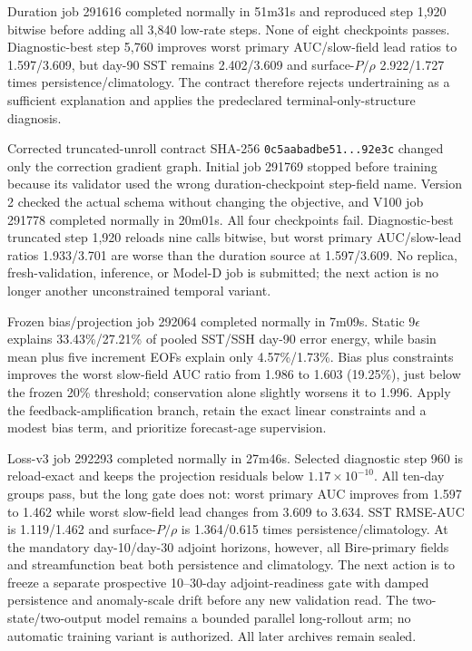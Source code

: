 \documentclass[11pt]{article}
\begin{document}
Duration job 291616 completed normally in 51m31s and reproduced step 1,920 bitwise
before adding all 3,840 low-rate steps.  None of eight checkpoints passes.
Diagnostic-best step 5,760 improves worst primary AUC/slow-field lead ratios to
1.597/3.609, but day-90 SST remains 2.402/3.609 and surface-\(P/\rho\)
2.922/1.727 times persistence/climatology.  The contract therefore rejects
undertraining as a sufficient explanation and applies the predeclared
terminal-only-structure diagnosis.

Corrected truncated-unroll contract SHA-256
\texttt{0c5aabadbe51...92e3c} changed only the correction gradient graph.  Initial
job 291769 stopped before training because its validator used the wrong
duration-checkpoint step-field name.  Version 2 checked the actual schema without
changing the objective, and V100 job 291778 completed normally in 20m01s.  All four
checkpoints fail.  Diagnostic-best truncated step 1,920 reloads nine calls bitwise,
but worst primary AUC/slow-lead ratios 1.933/3.701 are worse than the duration source
at 1.597/3.609.  No replica, fresh-validation, inference, or Model-D job is submitted;
the next action is no longer another unconstrained temporal variant.

Frozen bias/projection job 292064 completed normally in 7m09s.  Static
\(9\epsilon\) explains 33.43\%/27.21\% of pooled SST/SSH day-90 error energy, while
basin mean plus five increment EOFs explain only 4.57\%/1.73\%.  Bias plus
constraints improves the worst slow-field AUC ratio from 1.986 to 1.603 (19.25\%),
just below the frozen 20\% threshold; conservation alone slightly worsens it to
1.996.  Apply the feedback-amplification branch, retain the exact linear constraints
and a modest bias term, and prioritize forecast-age supervision.

Loss-v3 job 292293 completed normally in 27m46s.  Selected diagnostic step 960 is
reload-exact and keeps the projection residuals below \(1.17\times10^{-10}\).
All ten-day groups pass, but the long gate does not: worst primary AUC improves from
1.597 to 1.462 while worst slow-field lead changes from 3.609 to 3.634.  SST
RMSE-AUC is 1.119/1.462 and surface-\(P/\rho\) is 1.364/0.615 times
persistence/climatology.  At the mandatory day-10/day-30 adjoint horizons, however,
all Bire-primary fields and streamfunction beat both persistence and climatology.
The next action is to freeze a separate prospective 10--30-day adjoint-readiness gate
with damped persistence and anomaly-scale drift before any new validation read.
The two-state/two-output model remains a bounded parallel long-rollout arm; no
automatic training variant is authorized.  All later archives remain sealed.
\end{document}

